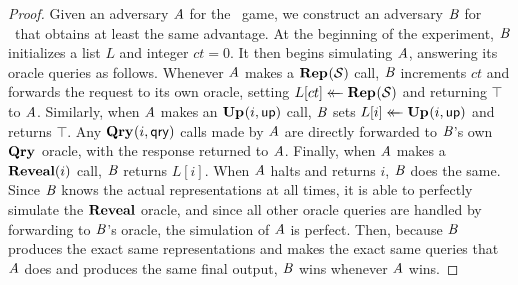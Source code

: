 \begin{proof}
Given an adversary $\mathit{A}$ for the \erreps\ game, we construct an adversary
$\mathit{B}$ for \errep\ that obtains at least the same advantage. At the beginning
of the experiment, $\mathit{B}$ initializes a list $L$ and integer $ct = 0$. It then
begins simulating $\mathit{A}$, answering its oracle queries as follows. Whenever
$\mathit{A}$ makes a $\textup{\textbf{Rep}}\hspace{0.5pt}(\mathcal{S})$ call, $\mathit{B}$ increments $ct$ and forwards the
request to its own oracle, setting $L[ct] \mathrel{\leftarrow\mkern-14mu\leftarrow} \textup{\textbf{Rep}}\hspace{0.5pt}(\mathcal{S})$ and returning
$\top$ to $\mathit{A}$. Similarly, when $\mathit{A}$ makes an $\textup{\textbf{Up}}\hspace{0.5pt}(i,\mathsf{up})$ call, $\mathit{B}$
sets $L[i] \mathrel{\leftarrow\mkern-14mu\leftarrow} \textup{\textbf{Up}}\hspace{0.5pt}(i,\mathsf{up})$ and returns $\top$. Any $\textup{\textbf{Qry}}\hspace{0.5pt}(i,\mathsf{qry})$ calls
made by $\mathit{A}$ are directly forwarded to $\mathit{B}$'s own $\textup{\textbf{Qry}}\hspace{0.5pt}$ oracle, with the
response returned to $\mathit{A}$. Finally, when $\mathit{A}$ makes a $\mathbf{Reveal}(i)$ call,
$\mathit{B}$ returns $L[i]$. When $\mathit{A}$ halts and returns $i$, $\mathit{B}$ does the
same. Since $\mathit{B}$ knows the actual representations at all times, it is able
to perfectly simulate the $\mathbf{Reveal}$ oracle, and since all other oracle queries are
handled by forwarding to $\mathit{B}$'s oracle, the simulation of $\mathit{A}$ is perfect.
Then, because $\mathit{B}$ produces the exact same representations and makes the
exact same queries that $\mathit{A}$ does and produces the same final output, $\mathit{B}$
wins whenever $\mathit{A}$ wins.
\end{proof}

